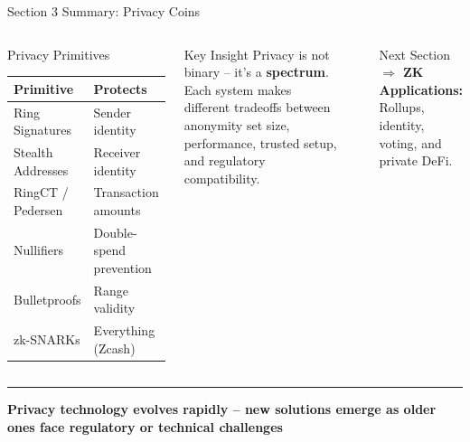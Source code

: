 \documentclass[8pt,aspectratio=169]{beamer}
\newcommand{\bottomnote}[1]{\vfill\vspace{-2mm}\textcolor{mllavender2}{\rule{\textwidth}{0.4pt}}\vspace{1mm}\footnotesize\textbf{#1}}
\begin{document}
\begin{frame}{Section 3 Summary: Privacy Coins}
\begin{columns}[T]
\begin{block}{\footnotesize Privacy Primitives}
\footnotesize
\begin{tabular}{l l}
\toprule
\textbf{Primitive} & \textbf{Protects} \\
\midrule
Ring Signatures & Sender identity \\
Stealth Addresses & Receiver identity \\
RingCT / Pedersen & Transaction amounts \\
Nullifiers & Double-spend prevention \\
Bulletproofs & Range validity \\
zk-SNARKs & Everything (Zcash) \\
\bottomrule
\end{tabular}
\end{block}
\vspace{0.1cm}
\begin{alertblock}{\footnotesize Key Insight}
\footnotesize
Privacy is not binary -- it's a \textbf{spectrum}. Each system makes different tradeoffs between anonymity set size, performance, trusted setup, and regulatory compatibility.
\end{alertblock}
\begin{center}
\end{center}
\vspace{0.1cm}
\begin{exampleblock}{\footnotesize Next Section}
\footnotesize
$\Rightarrow$ \textbf{ZK Applications:} Rollups, identity, voting, and private DeFi.
\end{exampleblock}
\end{columns}
\bottomnote{Privacy technology evolves rapidly -- new solutions emerge as older ones face regulatory or technical challenges}
\end{frame}
\end{document}
